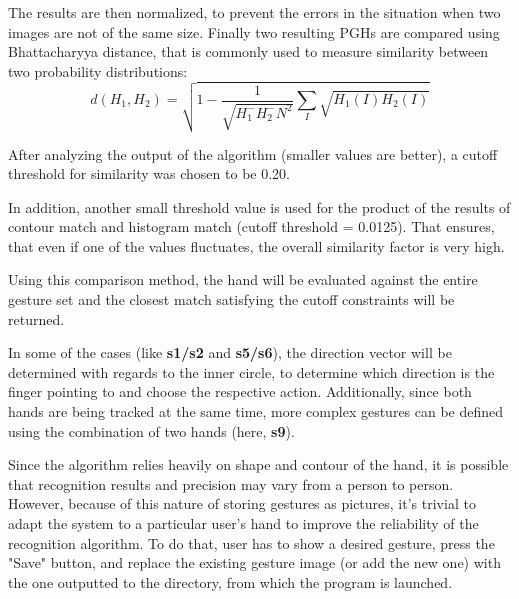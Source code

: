 \documentclass[a4paper,11pt,oneside]{article}
\begin{document}
\begin{itemize}
The results are then normalized, to prevent the errors in the situation when two images are not of the same size. Finally two resulting PGHs are compared using Bhattacharyya distance, that is commonly used to measure similarity between two probability distributions:
\[ d(H_1, H_2) = \sqrt{1- \frac{1}{ \sqrt{H_1^{-} H_2^{-} N^2}}  \sum\limits_{I} \sqrt{H_1(I) H_2(I)}} \] 

After analyzing the output of the algorithm (smaller values are better), a cutoff threshold for similarity was chosen to be 0.20.\\

\end{itemize}

In addition, another small threshold value is used for the product of the results of contour match and histogram match (cutoff threshold = 0.0125). That ensures, that even if one of the values fluctuates, the overall similarity factor is very high.

Using this comparison method, the hand will be evaluated against the entire gesture set and the closest match satisfying the cutoff constraints will be returned.

In some of the cases (like \textbf{s1/s2} and \textbf{s5/s6}), the direction vector will be determined with regards to the inner circle, to determine which direction is the finger pointing to and choose the respective action. Additionally, since both hands are being tracked at the same time, more complex gestures can be defined using the combination of two hands (here, \textbf{s9}).

Since the algorithm relies heavily on shape and contour of the hand, it is possible that recognition results and precision may vary from a person to person. However, because of this nature of storing gestures as pictures, it's trivial to adapt the system to a particular user's hand to improve the reliability of the recognition algorithm. To do that, user has to show a desired gesture, press the "Save" button, and replace the existing gesture image (or add the new one) with the one outputted to the directory, from which the program is launched. 
\end{document}
